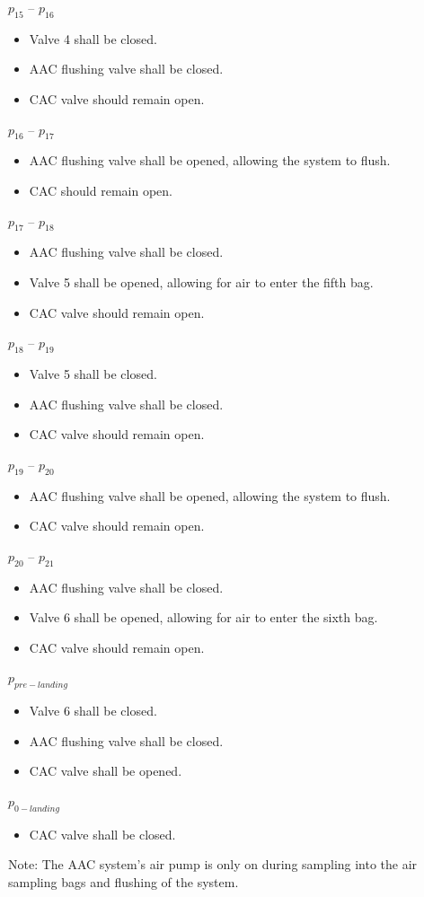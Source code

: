 $p_{15}$ – $p_{16}$
\begin{itemize}
    \item Valve 4 shall be closed.
    \item AAC flushing valve shall be closed.
    \item CAC valve should remain open.
\end{itemize}

$p_{16}$ – $p_{17}$
\begin{itemize}
    \item AAC flushing valve shall be opened, allowing the system to flush. 
    \item CAC should remain open.
  \end{itemize}

$p_{17}$ – $p_{18}$
\begin{itemize}
    \item AAC flushing valve shall be closed.
    \item Valve 5 shall be opened, allowing for air to enter the fifth bag. 
    \item CAC valve should remain open.
\end{itemize}

$p_{18}$ – $p_{19}$
\begin{itemize}
    \item Valve 5 shall be closed.
    \item AAC flushing valve shall be closed.
    \item CAC valve should remain open.
\end{itemize}

$p_{19}$ – $p_{20}$
\begin{itemize}
     \item AAC flushing valve shall be opened, allowing the system to flush. 
    \item CAC valve should remain open.
   \end{itemize}

$p_{20}$ – $p_{21}$
\begin{itemize}
    \item AAC flushing valve shall be closed.
    \item Valve 6 shall be opened, allowing for air to enter the sixth bag.
    \item CAC valve should remain open.
\end{itemize}

$p_{pre-landing}$ 
\begin{itemize}
    \item Valve 6 shall be closed.
    \item AAC flushing valve shall be closed.
    \item CAC valve shall be opened.
\end{itemize}

$p_{0-landing}$
\begin{itemize}
    \item CAC valve shall be closed.
\end{itemize}


Note: The AAC system's air pump is only on during sampling into the air sampling bags and flushing of the system.


\raggedbottom